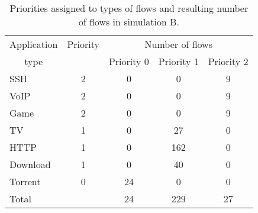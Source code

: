 \begin{table}
	\centering
	\begin{tabular}{@{}l|cccc@{}}
		\toprule
		\multicolumn{1}{c|}{Application} & Priority & \multicolumn{3}{c}{Number of flows}   \\
		\multicolumn{1}{c|}{type}        &          & Priority 0 & Priority 1 & Priority 2  \\ \midrule
		SSH                              &    2     &     0      &     0      &     9       \\
		VoIP                             &    2     &     0      &     0      &     9       \\
		Game                             &    2     &     0      &     0      &     9       \\
		TV                               &    1     &     0      &     27     &     0       \\
		HTTP                             &    1     &     0      &    162     &     0       \\
		Download                         &    1     &     0      &     40     &     0       \\
		Torrent                          &    0     &     24     &     0      &     0       \\ \midrule
		Total                            &          &     24     &    229     &     27      \\ \bottomrule
	\end{tabular}
	\caption{Priorities assigned to types of flows and resulting number of flows in simulation B.}
	\label{tab:flows_count_B}
\end{table}